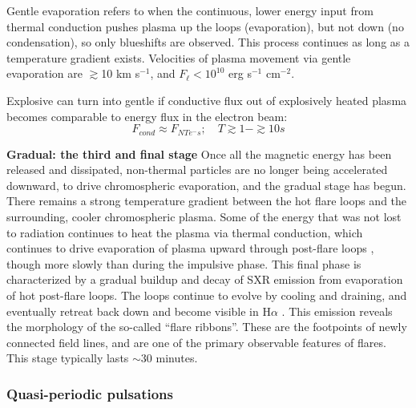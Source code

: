 Gentle evaporation refers to
when the continuous, lower energy input from thermal conduction
pushes plasma up the loops (evaporation), but not down (no condensation),
so only blueshifts are observed.
This process continues as long as a temperature gradient exists.
Velocities of plasma movement via gentle evaporation are
$\gtrsim$10 km s$^{-1}$, and $F_{\ell} < 10^{10}$ erg s$^{-1}$ cm$^{-2}$.

Explosive can turn into gentle if conductive flux out of explosively heated
plasma becomes comparable to energy flux in the electron beam:
\[
    F_{cond} \approx F_{NTe^{-}s}; \quad T \gtrsim 1 - \gtrsim 10s
\]



\textbf{Gradual: the third and final stage}\quad
Once all the magnetic energy has been released and dissipated,
non-thermal particles are no longer being accelerated downward,
to drive chromospheric evaporation, and
the gradual stage has begun.
There remains a strong temperature gradient between the hot flare loops and
the surrounding, cooler chromospheric plasma.
Some of the energy that
was not lost to radiation continues to heat the plasma via thermal
conduction, which continues to drive evaporation of plasma upward
through post-flare loops \citep{Battaglia2015}, though more slowly
than during the impulsive phase. This final phase is characterized by
a gradual buildup and decay of SXR emission from evaporation of hot
post-flare loops. The loops continue to evolve by cooling and
draining, and eventually retreat back down and become visible in
H$\alpha$ \citep{Hudson2007}. This emission reveals the morphology of
the so-called ``flare ribbons''. These are the footpoints of newly
connected field lines, and are one of the primary observable features
of flares. This stage typically lasts $\sim$30 minutes.

\subsubsection{Quasi-periodic pulsations}


